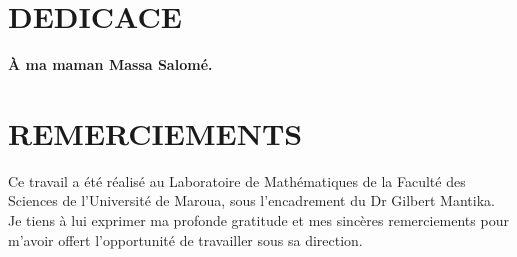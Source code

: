 \documentclass[a4paper, 14pt]{report}
\newcommand{\applyfontsize}{%
	\fontsize{12}{12}\selectfont
}
\begin{document}
	\newpage
	\begin{onehalfspace} %
		\lhead{}
		\rhead{}
		\chead{}
		
		
		\chapter*{DEDICACE}
		
		\begin{center}
			\textbf{\textbf{ \LARGE À ma maman Massa Salomé.}}
			\vspace{1cm} %
		\end{center}
		
		\chapter*{REMERCIEMENTS}
		{
			\applyfontsize %
			
			Ce travail a été réalisé au Laboratoire de Mathématiques de la Faculté des Sciences de l’Université de Maroua, sous l’encadrement du Dr Gilbert Mantika. Je tiens à lui exprimer ma profonde gratitude et mes sincères remerciements pour m’avoir offert l’opportunité de travailler sous sa direction.
			
}
\end{onehalfspace}
\end{document}
